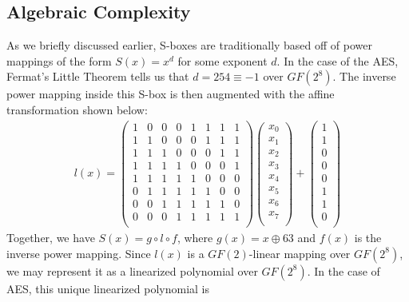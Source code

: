 \subsection{Algebraic Complexity} \label{sec:strength_alg_complexity}
As we briefly discussed earlier, S-boxes are traditionally based off of power mappings of the form $S(x) = x^d$ for some exponent $d$. In the case of the AES, Fermat's Little Theorem tells us that $d = 254 \equiv -1$ over $GF(2^8)$. The inverse power mapping inside this S-box is then augmented with the affine transformation shown below:
\begin{align*}
l(x) =  
\begin{pmatrix}
1 & 0 & 0 & 0 & 1 & 1 & 1 & 1 \\
1 & 1 & 0 & 0 & 0 & 1 & 1 & 1 \\
1 & 1 & 1 & 0 & 0 & 0 & 1 & 1 \\
1 & 1 & 1 & 1 & 0 & 0 & 0 & 1 \\
1 & 1 & 1 & 1 & 1 & 0 & 0 & 0 \\
0 & 1 & 1 & 1 & 1 & 1 & 0 & 0 \\
0 & 0 & 1 & 1 & 1 & 1 & 1 & 0 \\
0 & 0 & 0 & 1 & 1 & 1 & 1 & 1 \\
\end{pmatrix}
\begin{pmatrix}
x_0 \\
x_1 \\
x_2 \\
x_3 \\
x_4 \\ 
x_5 \\
x_6 \\
x_7 \\
\end{pmatrix}
+
\begin{pmatrix}
1 \\
1 \\
0 \\
0 \\
0 \\ 
1 \\
1 \\
0 \\
\end{pmatrix}
\end{align*}
Together, we have $S(x) = g \circ l \circ f $, where $g(x) = x \oplus 63$ and $f(x)$ is the inverse power mapping. Since $l(x)$ is a $GF(2)$-linear mapping over $GF(2^8)$, we may represent it as a linearized polynomial over $GF(2^8)$. In the case of AES, this unique linearized polynomial is 
